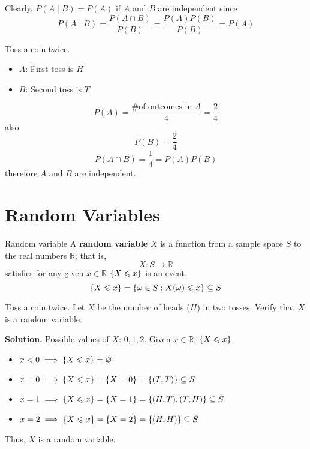 Clearly, $ P(A\mid B)=P(A) $ if $ A $ and $ B $ are independent since
\[ P(A\mid B)=\frac{P(A\cap B)}{P(B)}=\frac{P(A)P(B)}{P(B)}=P(A)  \]

\begin{Example}{}{}
    Toss a coin twice.
    \begin{itemize}
        \item $ A $: First toss is $ H $
        \item $ B $: Second toss is $ T $
    \end{itemize}
    \[ P(A)=\frac{\text{\# of outcomes in }A}{4}=\frac{2}{4}  \]
    also
    \[ P(B)=\frac{2}{4} \]
    \[ P(A\cap B)=\frac{1}{4}=P(A)P(B) \]
    therefore $ A $ and $ B $ are independent.
\end{Example}

\section{Random Variables}

\begin{Definition}{Random variable}{}
    A \textbf{random variable} $ X $
    is a function from a sample space $ S $ to the real numbers $ \mathbb{R} $; that is,
    \[ X:S\to \mathbb{R} \] satisfies for any given $ x\in\mathbb{R} $
    $ \{X\leqslant x\} $ is an event.
    \[ \{X\leqslant x\}=\{\omega\in S:X(\omega)\leqslant x\}
        \subseteq S \]
\end{Definition}

\begin{Example}{}{}
    Toss a coin twice. Let $ X $ be the number of heads ($ H $) in two tosses.
    Verify that $ X $ is a random variable.

    \textbf{Solution.}
    Possible values of $ X $: $ 0,1,2 $. Given $ x\in\mathbb{R} $,
    $ \{X\leqslant x\} $.
    \begin{itemize}
        \item $ x<0 \implies \{X\leqslant x\}=\varnothing $
        \item $ x=0 \implies \{X\leqslant x\}=\{X=0\}=\{(T,T)\}\subseteq S$
        \item $ x=1 \implies \{X\leqslant x\}=\{X=1\}=\{(H,T),(T,H)\}
                  \subseteq S $
        \item $ x=2 \implies \{X\leqslant x\}=\{X=2\}=
                  \{(H,H)\}\subseteq S $
    \end{itemize}
    Thus, $ X $ is a random variable.
\end{Example}

